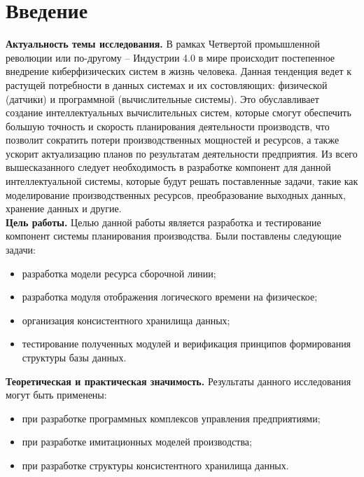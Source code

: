 \section*{Введение}
\indent \textbf{Актуальность темы исследования.}
В рамках Четвертой промышленной революции или по-другому -- Индустрии 4.0 в мире происходит постепенное внедрение киберфизических систем в жизнь человека.
Данная тенденция ведет к растущей потребности в данных системах и их состовляющих: физической (датчики) и программной (вычислительные системы).
Это обуславливает создание интеллектуальных вычислительных систем, которые смогут обеспечить большую точность и скорость планирования деятельности производств, что позволит сократить потери производственных мощностей и ресурсов, а также ускорит актуализацию планов по результатам деятельности предприятия.
Из всего вышесказанного следует необходимость в разработке компонент для данной интеллектуальной системы, которые будут решать поставленные задачи, такие как моделирование производственных ресурсов, преобразование выходных данных, хранение данных и другие.\\
\indent \textbf{Цель работы.}
Целью данной работы является разработка и тестирование компонент системы планирования производства.
Были поставлены следующие задачи:
\begin{itemize}
	\item разработка модели ресурса сборочной линии;
	\item разработка модуля отображения логического времени на физическое;
	\item организация консистентного хранилища данных;
	\item тестирование полученных модулей и верификация принципов формирования структуры базы данных.
\end{itemize}

\indent \textbf{Теоретическая и практическая значимость.}
Результаты данного исследования могут быть применены:
\begin{itemize}
	\item при разработке программных комплексов управления предприятиями;
	\item при разработке имитационных моделей производства;
	\item при разработке структуры консистентного хранилища данных.
\end{itemize}

